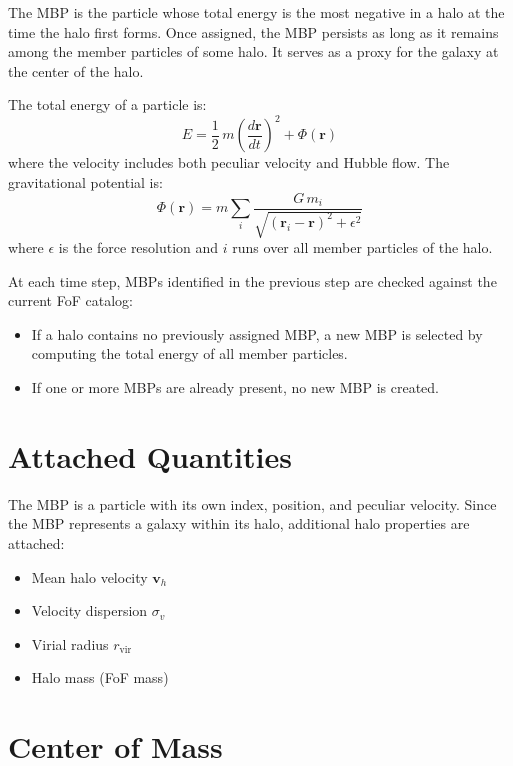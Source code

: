 \documentclass[11pt,fleqn]{book}
\begin{document}
\begin{definition}
The MBP is the particle whose total energy is the most negative in a halo at the time the halo first forms.  Once assigned, the MBP persists as long as it remains among the member particles of some halo.  It serves as a proxy for the galaxy at the center of the halo.

The total energy of a particle is:
\begin{equation}
  E = \frac{1}{2}\,m\left(\frac{d\mathbf{r}}{dt}\right)^2 + \Phi(\mathbf{r})
\end{equation}
where the velocity includes both peculiar velocity and Hubble flow.  The gravitational potential is:
\begin{equation}
  \Phi(\mathbf{r}) = m\sum_i \frac{G\,m_i}{\sqrt{(\mathbf{r}_i - \mathbf{r})^2 + \epsilon^2}}
\end{equation}
where $\epsilon$ is the force resolution and $i$ runs over all member particles of the halo.
\end{definition}

At each time step, MBPs identified in the previous step are checked against the current FoF catalog:
\begin{itemize}[leftmargin=2em]
  \item If a halo contains no previously assigned MBP, a new MBP is selected by computing the total energy of all member particles.
  \item If one or more MBPs are already present, no new MBP is created.
\end{itemize}

\section{Attached Quantities}

The MBP is a particle with its own index, position, and peculiar velocity.  Since the MBP represents a galaxy within its halo, additional halo properties are attached:
\begin{itemize}[leftmargin=2em]
  \item Mean halo velocity $\mathbf{v}_h$
  \item Velocity dispersion $\sigma_v$
  \item Virial radius $r_\text{vir}$
  \item Halo mass (FoF mass)
\end{itemize}

\section{Center of Mass}
\end{document}
